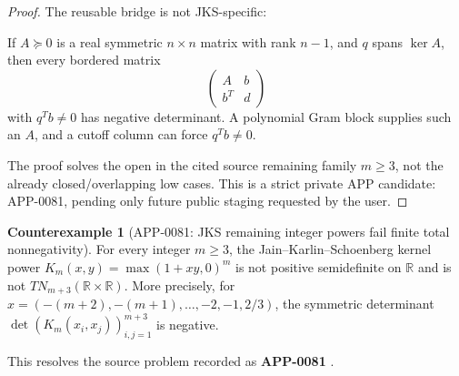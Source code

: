 \documentclass[11pt]{article}
\numberwithin{equation}{section}
\theoremstyle{definition}
\newtheorem{counterexample}[theorem]{Counterexample}
\theoremstyle{remark}
\newcommand{\1}{\mathbf 1}
\begin{document}
\begin{proof}
The reusable bridge is not JKS-specific:

If \(A\succeq0\) is a real symmetric \(n\times n\) matrix with rank \(n-1\),
and \(q\) spans \(\ker A\), then every bordered matrix
\[
\begin{pmatrix}A&b\\ b^T&d\end{pmatrix}
\]
with \(q^T b\ne0\) has negative determinant. A polynomial Gram block supplies
such an \(A\), and a cutoff column can force \(q^T b\ne0\).

The proof solves the open in the cited source remaining family \(m\ge3\), not the already
closed/overlapping low cases. This is a strict private APP candidate:
APP-0081, pending only future public staging requested by the user.
\end{proof}

\begin{counterexample}[APP-0081: JKS remaining integer powers fail finite total nonnegativity]
\label{res:jks-integerpowers-mge3-nottn}
For every integer \(m\ge3\), the Jain--Karlin--Schoenberg kernel power \(K_m(x,y)=\max(1+xy,0)^m\) is not positive semidefinite on \(\mathbb R\) and is not \(TN_{m+3}(\mathbb R\times\mathbb R)\). More precisely, for \(x=(-(m+2),-(m+1),\ldots,-2,-1,2/3)\), the symmetric determinant \(\det(K_m(x_i,x_j))_{i,j=1}^{m+3}\) is negative.



This resolves the source problem recorded as \textbf{APP-0081} \cite{app-app-0065-source}.
\end{counterexample}
\end{document}
